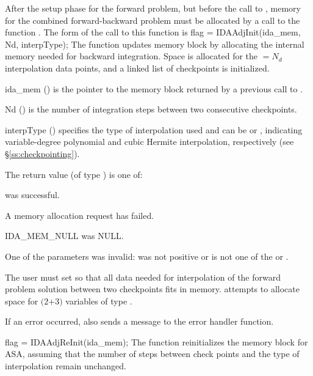 After the setup phase for the forward problem, but before the call
to , memory for the combined forward-backward problem must be
allocated by a call to the function .
The form of the call to this function is
{
  flag = IDAAdjInit(ida\_mem, Nd, interpType);
}
{
  The function  updates {\idas} memory block by allocating 
  the internal memory needed for backward integration.
  Space is allocated for the  $= N_d$ interpolation data points, and
  a linked list of checkpoints is initialized.
}
{
  \begin{args}[interpType]
  \item[ida\_mem] () 
    is the pointer to the {\idas} memory block returned by a previous call
    to .
  \item[Nd] () 
    is the number of integration steps between two consecutive checkpoints.
  \item[interpType] ()
    specifies the type of interpolation used and can be 
    or , indicating variable-degree polynomial and cubic Hermite
    interpolation, respectively (see \S\ref{ss:checkpointing}).
  \end{args}
}
{
   The return value  (of type ) is one of:
   \begin{args}
   \item[\Id{IDA\_SUCCESS}] 
      was successful.
   \item[\Id{IDA\_MEM\_FAIL}]
     A memory allocation request has failed.
   \item[IDA\_MEM\_NULL] 
      was NULL.
   \item[\Id{IDA\_ILL\_INPUT}]
     One of the parameters was invalid:  was not positive or 
     is not one of the  or .
   \end{args}
}
{
  The user must set  so that all data needed for interpolation of the 
  forward problem solution between two checkpoints fits in memory. 
  attempts to allocate space for $(2$$+3)$ variables of type .

  If an error occurred,  also sends a message to the
  error handler function.
}
{
  flag = IDAAdjReInit(ida\_mem);
}
{
  The function  reinitializes the {\idas} memory
  block for ASA, assuming that the number of steps between check
  points and the type of interpolation remain unchanged.
}
